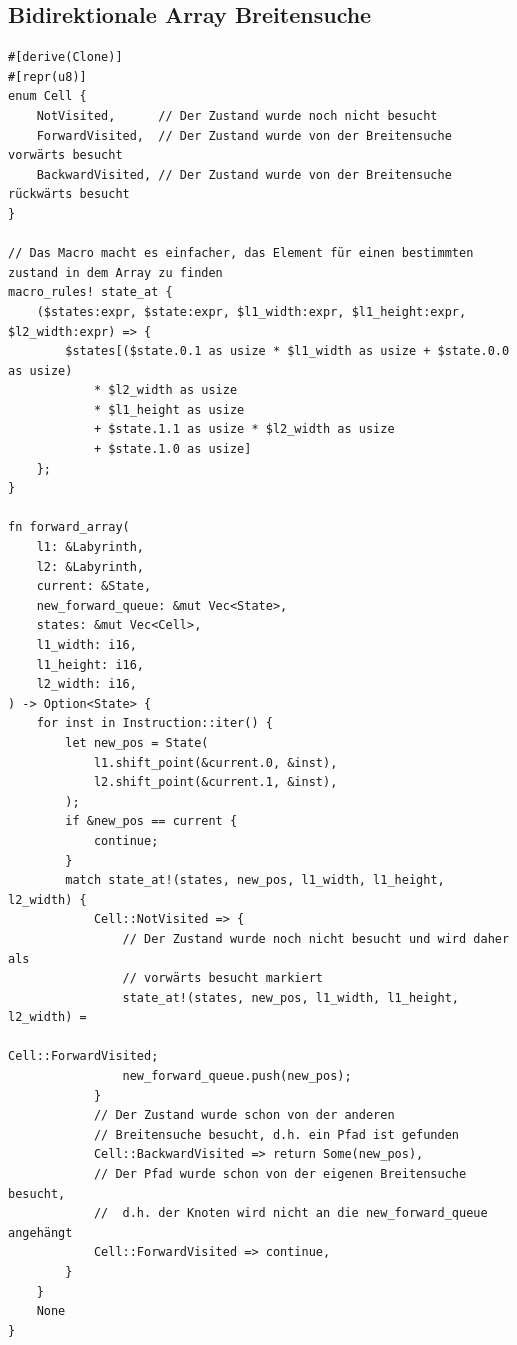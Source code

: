 \documentclass[a4paper,10pt,ngerman]{scrartcl}
\begin{document}
    \subsection{Bidirektionale Array Breitensuche }
    \begin{verbatim}
#[derive(Clone)]
#[repr(u8)]
enum Cell {
    NotVisited,      // Der Zustand wurde noch nicht besucht
    ForwardVisited,  // Der Zustand wurde von der Breitensuche vorwärts besucht
    BackwardVisited, // Der Zustand wurde von der Breitensuche rückwärts besucht
}

// Das Macro macht es einfacher, das Element für einen bestimmten zustand in dem Array zu finden
macro_rules! state_at {
    ($states:expr, $state:expr, $l1_width:expr, $l1_height:expr, $l2_width:expr) => {
        $states[($state.0.1 as usize * $l1_width as usize + $state.0.0 as usize)
            * $l2_width as usize
            * $l1_height as usize
            + $state.1.1 as usize * $l2_width as usize
            + $state.1.0 as usize]
    };
}

fn forward_array(
    l1: &Labyrinth,
    l2: &Labyrinth,
    current: &State,
    new_forward_queue: &mut Vec<State>,
    states: &mut Vec<Cell>,
    l1_width: i16,
    l1_height: i16,
    l2_width: i16,
) -> Option<State> {
    for inst in Instruction::iter() {
        let new_pos = State(
            l1.shift_point(&current.0, &inst),
            l2.shift_point(&current.1, &inst),
        );
        if &new_pos == current {
            continue;
        }
        match state_at!(states, new_pos, l1_width, l1_height, l2_width) {
            Cell::NotVisited => {
                // Der Zustand wurde noch nicht besucht und wird daher als
                // vorwärts besucht markiert
                state_at!(states, new_pos, l1_width, l1_height, l2_width) =
                                                            Cell::ForwardVisited;
                new_forward_queue.push(new_pos);
            }
            // Der Zustand wurde schon von der anderen
            // Breitensuche besucht, d.h. ein Pfad ist gefunden
            Cell::BackwardVisited => return Some(new_pos),
            // Der Pfad wurde schon von der eigenen Breitensuche besucht,
            //  d.h. der Knoten wird nicht an die new_forward_queue angehängt
            Cell::ForwardVisited => continue,
        }
    }
    None
}


\end{verbatim}
\end{document}
